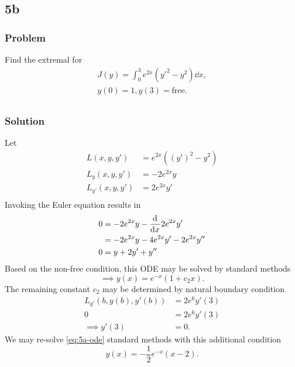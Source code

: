 \documentclass[12pt,twoside]{article}
\begin{document}
\subsection{5b}
\subsubsection*{Problem}
Find the extremal for
\begin{equation}
  \label{eq:5a-problem}
  \begin{aligned}
    J(y) = \int_0^3 e^{2x}(y'^2-y^2)\dd{x}, \\
    y(0)=1, y(3)=\text{free}. \\
  \end{aligned}
\end{equation}

\subsubsection*{Solution}
Let
\begin{align*}
  L(x,y,y') &= e^{2 x} \left({\left(y'\right)}^2-y^2\right) \\
  L_y(x,y,y') &= -2 e^{2 x} y \\
  L_{y'}(x,y,y') &= 2 e^{2 x} y' \\
\end{align*}
Invoking the Euler equation results in
\begin{equation}
\label{eq:5a-ode}
\begin{aligned}
  0 &= -2 e^{2 x} y - \frac{\mathrm{d}^{} {}}{\mathrm{d}{x}^{}}2 e^{2 x} y' \\
    &= -2 e^{2 x} y - 4e^{2x}y' - 2e^{2x}y'' \\
  0 &= y + 2y' + y''
\end{aligned}
\end{equation}
Based on the non-free condition, this ODE may be solved by standard methods
\begin{equation*}
  \implies y(x) = e^{-x}(1+c_2x).
\end{equation*}
The remaining constant $c_2$ may be determined by natural boundary condition
\begin{align*}
  L_{y'}(b,y(b),y'(b)) &= 2 e^{6} y'(3) \\
  0 &= 2e^{6}y'(3) \\
  \implies y'(3) &= 0.
\end{align*}
We may re-solve \cref{eq:5a-ode} standard methods with this additional condition
\begin{equation*}
  \boxed{y(x) = -\frac{1}{2} e^{-x} (x-2).}
\end{equation*}
\end{document}

